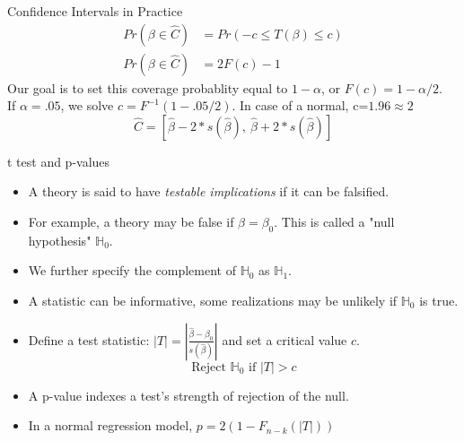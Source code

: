 \documentclass[aspectratio=169, handout, t]{beamer}
\numberwithin{equation}{section}
\begin{document}
\begin{frame}{Confidence Intervals in Practice}
\begin{align*}
Pr(\beta\in \hat{C})&=Pr(-c\leq T(\beta)\leq c)\\
Pr(\beta\in \hat{C})&=2F(c)-1
\end{align*}
Our goal is to set this coverage probablity equal to $1-\alpha$, or $F(c)=1-\alpha/2$.\\
If $\alpha=.05$, we solve $c=F^{-1}(1-.05/2)$.  In case of a normal, c=$1.96\approx 2$
$$\hat{C}=[\hat{\beta}-2*s(\hat{\beta}),\ \hat{\beta}+2*s(\hat{\beta})]$$
\end{frame}

\begin{frame}{t test and p-values}
\begin{itemize}
\item  A theory is said to have \emph{testable implications} if it can be falsified. \pause
\item For example, a theory may be false if $\beta=\beta_0$.  This is called a "null hypothesis" $\mathbb{H}_0$. \pause
\item We further specify the complement of $\mathbb{H}_0$ as $\mathbb{H}_1$. \pause
\item A statistic can be informative, some realizations may be unlikely if $\mathbb{H}_0$ is true. \pause
\item Define a test statistic: $|T|=\left| \frac{\hat{\beta}-\beta_0}{s(\hat{\beta})}\right|$ and set a critical value $c$.
$$\text{Reject }\mathbb{H}_0\text{ if } |T|>c$$ 
\item A p-value indexes a test's strength of rejection of the null. \pause
\item In a normal regression model, $p=2(1-F_{n-k}(|T|))$ 
\end{itemize}
\end{frame}
\end{document}
